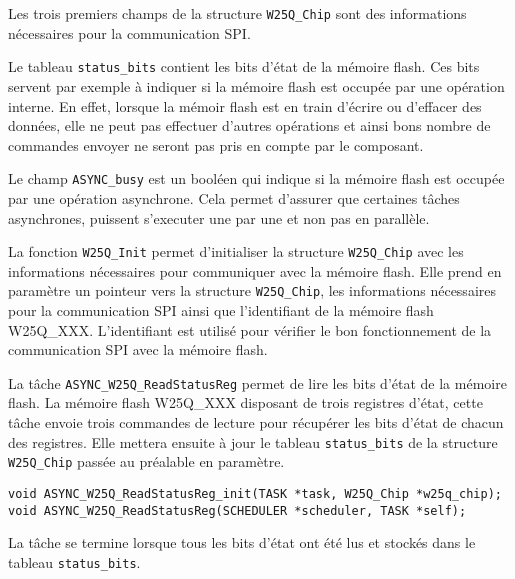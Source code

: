 Les trois premiers champs de la structure \texttt{W25Q\_Chip} sont des informations
nécessaires pour la communication SPI.

Le tableau \texttt{status\_bits} contient les bits d'état de la mémoire flash. Ces
bits servent par exemple à indiquer si la mémoire flash est occupée par une
opération interne. En effet, lorsque la mémoir flash est en train d'écrire ou
d'effacer des données, elle ne peut pas effectuer d'autres opérations et ainsi bons
nombre de commandes envoyer ne seront pas pris en compte par le composant.

Le champ \texttt{ASYNC\_busy} est un booléen qui indique si la mémoire flash est
occupée par une opération asynchrone. Cela permet d'assurer que certaines tâches
asynchrones, puissent s'executer une par une et non pas en parallèle.

La fonction \texttt{W25Q\_Init} permet d'initialiser la structure \texttt{W25Q\_Chip}
avec les informations nécessaires pour communiquer avec la mémoire flash. Elle
prend en paramètre un pointeur vers la structure \texttt{W25Q\_Chip}, les informations
nécessaires pour la communication SPI ainsi que l'identifiant de la mémoire flash
W25Q\_XXX. L'identifiant est utilisé pour vérifier le bon fonctionnement de la
communication SPI avec la mémoire flash.

\newpage


La tâche \texttt{ASYNC\_W25Q\_ReadStatusReg} permet de lire les bits d'état de la
mémoire flash. La mémoire flash W25Q\_XXX disposant de trois registres d'état, cette
tâche envoie trois commandes de lecture pour récupérer les bits d'état de chacun des
registres. Elle mettera ensuite à jour le tableau \texttt{status\_bits} de la
structure \texttt{W25Q\_Chip} passée au préalable en paramètre.

\begin{lstlisting}[style=prog, frame=shadowbox, label={lst:ASYNC_W25Q_ReadStatusReg},
    emph={[1]ASYNC_W25Q_ReadStatusReg_init, ASYNC_W25Q_ReadStatusReg}, emphstyle={[1]\color{C}},
    emph={[2]W25Q_Chip, SCHEDULER, TASK}, emphstyle={[2]\color{E}}]
void ASYNC_W25Q_ReadStatusReg_init(TASK *task, W25Q_Chip *w25q_chip);
void ASYNC_W25Q_ReadStatusReg(SCHEDULER *scheduler, TASK *self);
\end{lstlisting}

La tâche se termine lorsque tous les bits d'état ont été lus et stockés dans le
tableau \texttt{status\_bits}.


